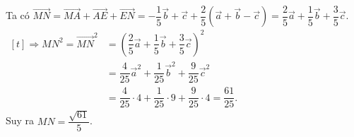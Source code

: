 \begin{ex}
{\begin{itemchoice}
			Ta có $\vec{MN}=\vec{MA}+\vec{AE}+\vec{EN}=-\dfrac15\vec b+\vec c+\dfrac25\left(\vec a+\vec b-\vec c\right)=\dfrac25\vec a+\dfrac15\vec b+\dfrac35\vec c$.\\
			$\begin{aligned}[t]
				\Rightarrow MN^2=\vec{MN}^2&=\left(\dfrac25\vec a+\dfrac15\vec b+\dfrac35\vec c\right)^2\\&=\dfrac{4}{25}\vec a^2+\dfrac{1}{25}\vec b^2+\dfrac{9}{25}\vec c^2\\&=\dfrac{4}{25}\cdot 4+\dfrac{1}{25}\cdot 9+\dfrac{9}{25}\cdot 4=\dfrac{61}{25}.
			\end{aligned}$\\
			Suy ra $MN=\dfrac{\sqrt{61}}{5}$.
		\end{itemchoice}
	}
\end{ex}

